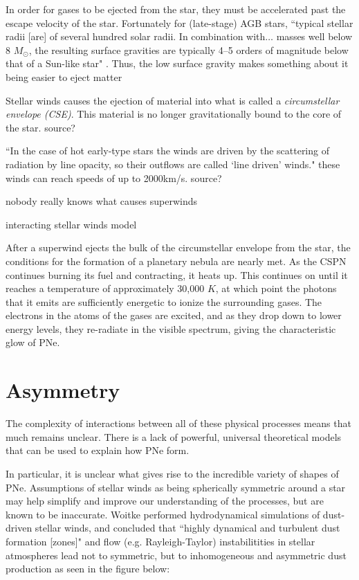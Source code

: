 \documentclass[a4paper,11pt,twocolumn]{article}
\begin{document}
In order for gases to be ejected from the star, they must be accelerated past the escape velocity of the star. Fortunately for (late-stage) AGB stars, ``typical stellar radii [are] of several hundred solar radii. In combination with$\ldots$ masses well below 8 $M_\odot$, the resulting surface gravities are typically 4–5 orders of magnitude below that of a Sun-like star" \cite{hofner}. Thus, the low surface gravity makes {\huge something about it being easier to eject matter}

Stellar winds causes the ejection of material into what is called a \textit{circumstellar envelope (CSE)}. This material is no longer gravitationally bound to the core of the star. {\huge source?}

``In the case of hot early-type stars the winds are driven by the scattering of radiation by line opacity, so their outflows are called ‘line driven’ winds." \cite{lamers} {\huge these winds can reach speeds of up to 2000km/s. source?}

{\huge nobody really knows what causes superwinds}

{\huge interacting stellar winds model}






After a superwind ejects the bulk of the circumstellar envelope from the star, the conditions for the formation of a planetary nebula are nearly met. As the CSPN continues burning its fuel and contracting, it heats up. This continues on until it reaches a temperature of approximately 30,000 $K$, at which point the photons that it emits are sufficiently energetic to ionize the surrounding gases. The electrons in the atoms of the gases are excited, and as they drop down to lower energy levels, they re-radiate in the visible spectrum, giving the characteristic glow of PNe.


\section{Asymmetry}

The complexity of interactions between all of these physical processes means that much remains unclear. There is a lack of powerful, universal theoretical models that can be used to explain how PNe form.

In particular, it is unclear what gives rise to the incredible variety of shapes of PNe. Assumptions of stellar winds as being spherically symmetric around a star may help simplify and improve our understanding of the processes, but are known to be inaccurate. Woitke performed hydrodynamical simulations of dust-driven stellar winds, and concluded that ``highly dynamical and turbulent dust formation [zones]" and flow (e.g. Rayleigh-Taylor) instabilitities \cite{woitke} in stellar atmospheres lead not to symmetric, but to inhomogeneous and asymmetric dust production as seen in the figure below:
\end{document}
